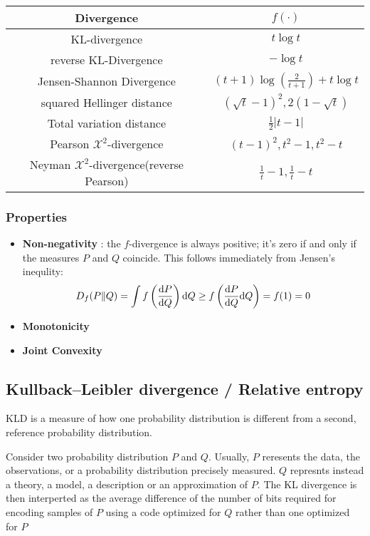 \begin{center}
    \begin{tabular}{cc}
        \toprule
        Divergence & $f(\cdot)$ \\
        \midrule
        KL-divergence & $t\log{t}$ \\
        reverse KL-Divergence & $-\log{t}$ \\
        Jensen-Shannon Divergence & $(t+1)\log(\frac{2}{t+1}) + t\log t$ \\
        squared Hellinger distance & $(\sqrt{t} - 1)^2, 2(1 - \sqrt{t})$ \\
        Total variation distance & $\frac{1}{2}|t-1|$ \\
        Pearson $\mathcal{X}^2$-divergence & $(t-1)^2, t^2 - 1, t^2 - t$ \\
        Neyman $\mathcal{X}^2$-divergence(reverse Pearson) & $\frac{1}{t} - 1, \frac{1}{t} - t$ \\
        \bottomrule
    \end{tabular}
\end{center}

\subsubsection{Properties}
\begin{itemize}
    \item \textbf{Non-negativity} : the $f$-divergence is always positive; it's zero if and only if
    the measures $P$ and $Q$ coincide. This follows immediately from Jensen's inequlity:
    \begin{equation}
        D_f(P\|Q) = \int f \left(\frac{\mathrm{d} P}{\mathrm{d} Q}\right) \mathrm{d} Q \geq f\left(\frac{\mathrm{d} P}{\mathrm{d} Q} \mathrm{d} Q\right) = f(1) = 0
    \end{equation}
    \item \textbf{Monotonicity}
    \item \textbf{Joint Convexity}
\end{itemize}

\subsection{Kullback–Leibler divergence / Relative entropy}
KLD  is a measure of how one probability distribution is different from a second, reference probability distribution.

Consider two probability distribution $P$ and $Q$. Usually, $P$ reresents the data, the observations, or a probability
distribution precisely measured. $Q$ represnts instead a theory, a model, a description or an approximation of $P$.
The KL divergence is then interperted as the average difference of the number of bits required for encoding samples of $P$
using a code optimized for $Q$ rather than one optimized for $P$


